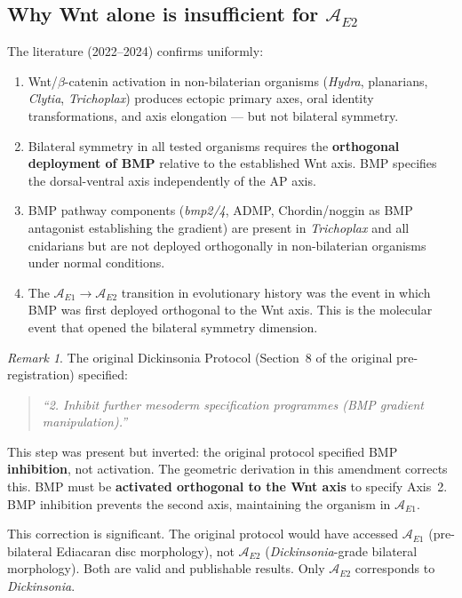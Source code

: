 \documentclass[12pt, a4paper]{article}
\theoremstyle{definition}
\theoremstyle{remark}
\newtheorem{remark}{Remark}[section]
\begin{document}
\subsection{Why Wnt alone is insufficient for
$\mathcal{A}_{E2}$}

The literature (2022--2024) confirms uniformly:

\begin{enumerate}
  \item Wnt/$\beta$-catenin activation in non-bilaterian
        organisms (\textit{Hydra}, planarians,
        \textit{Clytia}, \textit{Trichoplax}) produces
        ectopic primary axes, oral identity transformations,
        and axis elongation --- but not bilateral symmetry.

  \item Bilateral symmetry in all tested organisms
        requires the \textbf{orthogonal deployment of BMP}
        relative to the established Wnt axis. BMP
        specifies the dorsal-ventral axis independently
        of the AP axis.

  \item BMP pathway components (\textit{bmp2/4}, ADMP,
        Chordin/noggin as BMP antagonist establishing
        the gradient) are present in \textit{Trichoplax}
        \cite{srivastava2008} and all cnidarians but are
        not deployed orthogonally in non-bilaterian
        organisms under normal conditions.

  \item The $\mathcal{A}_{E1} \to \mathcal{A}_{E2}$
        transition in evolutionary history was the event
        in which BMP was first deployed orthogonal to the
        Wnt axis. This is the molecular event that opened
        the bilateral symmetry dimension.
\end{enumerate}

\begin{remark}
The original Dickinsonia Protocol (Section~8 of the
original pre-registration) specified:

\begin{quote}
\textit{``2. Inhibit further mesoderm specification
programmes (BMP gradient manipulation).''}
\end{quote}

This step was present but inverted: the original protocol
specified BMP \textbf{inhibition}, not activation. The
geometric derivation in this amendment corrects this.
BMP must be \textbf{activated orthogonal to the Wnt axis}
to specify Axis~2. BMP inhibition prevents the second axis,
maintaining the organism in $\mathcal{A}_{E1}$.

This correction is significant. The original protocol
would have accessed $\mathcal{A}_{E1}$ (pre-bilateral
Ediacaran disc morphology), not $\mathcal{A}_{E2}$
(\textit{Dickinsonia}-grade bilateral morphology).
Both are valid and publishable results. Only $\mathcal{A}_{E2}$
corresponds to \textit{Dickinsonia}.
\end{remark}
\end{document}
